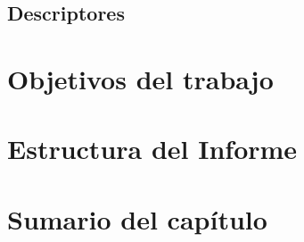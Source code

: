 		\subsection{Descriptores}
			\label{usb:dscr}
			
%		
	\section{Objetivos del trabajo}
		\label{int:obj}
		
	\section{Estructura del Informe}
		\label{int:est}
		
	\section{Sumario del capítulo} 
		\label{int:res}
		
		
%	
%	